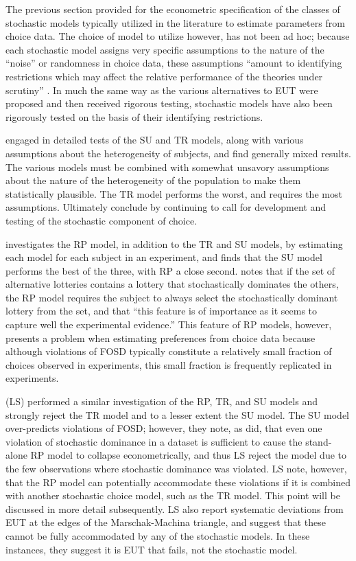 \documentclass[../main.tex]{subfiles}
\begin{document}
The previous section provided for the econometric specification of the classes of stochastic models typically utilized in the literature to estimate parameters from choice data.
The choice of model to utilize however, has not been ad hoc;
because each stochastic model assigns very specific assumptions to the nature of the \enquote{noise} or randomness in choice data, these assumptions \enquote{amount to identifying restrictions which may affect the relative performance of the theories under scrutiny} \parencite[1091]{Ballinger1997}.
In much the same way as the various alternatives to EUT were proposed and then received rigorous testing, stochastic models have also been rigorously tested on the basis of their identifying restrictions.

\textcite{Ballinger1997} engaged in detailed tests of the SU and TR models, along with various assumptions about the heterogeneity of subjects, and find generally mixed results.
The various models must be combined with somewhat unsavory assumptions about the nature of the heterogeneity of the population to make them statistically plausible.
The TR model performs the worst, and requires the most assumptions.
Ultimately \textcite[1104]{Ballinger1997} conclude by continuing to call for development and testing of the stochastic component of choice.

\textcite{Carbone1997} investigates the RP model, in addition to the TR and SU models, by estimating each model for each subject in an experiment, and finds that the SU model performs the best of the three, with RP a close second.
\textcite[307]{Carbone1997} notes that if the set of alternative lotteries contains a lottery that stochastically dominates the others, the RP model requires the subject to always select the stochastically dominant lottery from the set, and that \enquote{this feature is of importance as it seems to capture well the experimental evidence.}
This feature of RP models, however, presents a problem when estimating preferences from choice data because although violations of FOSD typically constitute a relatively small fraction of choices observed in experiments, this small fraction is frequently replicated in experiments.

\textcite{Loomes1998} (LS) performed a similar investigation of the RP, TR, and SU models and strongly reject the TR model and to a lesser extent the SU model.
The SU model over-predicts violations of FOSD; however, they note, as \textcite{Carbone1997} did, that even one violation of stochastic dominance in a dataset is sufficient to cause the stand-alone RP model to collapse econometrically, and thus LS reject the model due to the few observations where stochastic dominance was violated.
LS note, however, that the RP model can potentially accommodate these violations if it is combined with another stochastic choice model, such as the TR model.
This point will be discussed in more detail subsequently.
LS also report systematic deviations from EUT at the edges of the Marschak-Machina triangle, and suggest that these cannot be fully accommodated by any of the stochastic models.
In these instances, they suggest it is EUT that fails, not the stochastic model.
\end{document}
